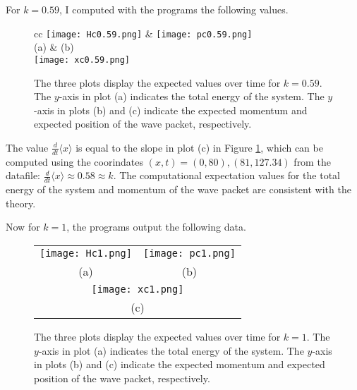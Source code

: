 For $k = 0.59$, I computed with the programs
the following values.

\begin{figure}[H]
    \centering
    \begin{tabular}{cc}
        \texttt{[image: Hc0.59.png]}
        &
        \texttt{[image: pc0.59.png]}
        \\
        (a) & (b)
        \\
        {\texttt{[image: xc0.59.png]}}
        \\
    \end{tabular}
    \caption[Expected Values over Time for $k = 0.59$]{The three plots
    display the expected values over time for $k = 0.59$. The $y$-axis in
    plot (a) indicates the total energy of the system. The $y$-axis in plots
    (b) and (c) indicate the expected momentum and expected position of the
    wave packet, respectively.}
    \label{fig:c0.59}
\end{figure}

The value $\frac{d}{dt} \langle x \rangle$ is equal to the slope in plot (c)
in Figure \ref{fig:c0.59}, which can be computed using the coorindates
$(x, t) = (0, 80), (81, 127.34)$ from the datafile: $\frac{d}{dt} \langle x
\rangle \approx 0.58 \approx k$. The computational expectation values for
the total energy of the system and momentum of the wave packet are
consistent with the theory.

\pagebreak

Now for $k = 1$, the programs output the following data.

\begin{figure}[H]
    \centering
    \begin{tabular}{cc}
        \texttt{[image: Hc1.png]}
        &
        \texttt{[image: pc1.png]}
        \\
        (a) & (b)
        \\
        \multicolumn{2}{c}{\texttt{[image: xc1.png]}}
        \\
        \multicolumn{2}{c}{(c)}
    \end{tabular}
    \caption[Expected Values over Time for $k = 1$]{The three plots display
    the expected values over time for $k = 1$. The $y$-axis in plot (a)
    indicates the total energy of the system. The $y$-axis in plots (b) and
    (c) indicate the expected momentum and expected position of the wave
    packet, respectively.}
    \label{fig:c1}
\end{figure}

